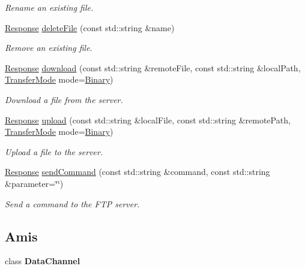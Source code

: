 \begin{DoxyCompactItemize}
\begin{DoxyCompactList}\small\item\em Rename an existing file. \end{DoxyCompactList}\item 
\hyperlink{classsf_1_1Ftp_1_1Response}{Response} \hyperlink{classsf_1_1Ftp_a8aa272b0eb7769a850006e70fcad370f}{delete\+File} (const std\+::string \&name)
\begin{DoxyCompactList}\small\item\em Remove an existing file. \end{DoxyCompactList}\item 
\hyperlink{classsf_1_1Ftp_1_1Response}{Response} \hyperlink{classsf_1_1Ftp_a20c1600ec5fd6f5a2ad1429ab8aa5df4}{download} (const std\+::string \&remote\+File, const std\+::string \&local\+Path, \hyperlink{classsf_1_1Ftp_a1cd6b89ad23253f6d97e6d4ca4d558cb}{Transfer\+Mode} mode=\hyperlink{classsf_1_1Ftp_a1cd6b89ad23253f6d97e6d4ca4d558cba6f253b362639fb5e059dc292762a21ee}{Binary})
\begin{DoxyCompactList}\small\item\em Download a file from the server. \end{DoxyCompactList}\item 
\hyperlink{classsf_1_1Ftp_1_1Response}{Response} \hyperlink{classsf_1_1Ftp_a46d6e15cddd719288b5a08b685e11765}{upload} (const std\+::string \&local\+File, const std\+::string \&remote\+Path, \hyperlink{classsf_1_1Ftp_a1cd6b89ad23253f6d97e6d4ca4d558cb}{Transfer\+Mode} mode=\hyperlink{classsf_1_1Ftp_a1cd6b89ad23253f6d97e6d4ca4d558cba6f253b362639fb5e059dc292762a21ee}{Binary})
\begin{DoxyCompactList}\small\item\em Upload a file to the server. \end{DoxyCompactList}\item 
\hyperlink{classsf_1_1Ftp_1_1Response}{Response} \hyperlink{classsf_1_1Ftp_a44e095103ecbce175a33eaf0820440ff}{send\+Command} (const std\+::string \&command, const std\+::string \&parameter=\char`\"{}\char`\"{})
\begin{DoxyCompactList}\small\item\em Send a command to the F\+TP server. \end{DoxyCompactList}\end{DoxyCompactItemize}
\subsection*{Amis}
\begin{DoxyCompactItemize}
\item 
\mbox{\label{classsf_1_1Ftp_a8dee57337b6a7e183bfe21d178757b0c}} 
class {\bfseries Data\+Channel}
\end{DoxyCompactItemize}


